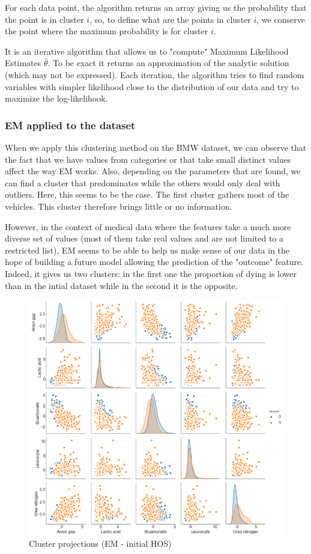 \documentclass[15pt]{article}
\begin{document}
\begin{multicols}{2}
For each data point, the algorithm returns an array giving us the probability that the point is in cluster $i$, so, to define what are the points in cluster $i$, we conserve the point where the maximum probability is for cluster $i$.

It is an iterative algorithm that allows us to "compute" Maximum Likelihood Estimates $\hat{\theta}$. To be exact it returns an approximation of the analytic solution (which may not be expressed). Each iteration, the algorithm tries to find random variables with simpler likelihood close to the distribution of our data and try to maximize the log-likelihook.

\subsubsection{EM applied to the dataset}

When we apply this clustering method on the BMW dataset, we can observe that the fact that we have values from categories or that take small distinct values affect the way EM works. Also, depending on the parameters that are found, we can find a cluster that predominates while the others would only deal with outliers. Here, this seems to be the case. The first cluster gathers most of the vehicles. This cluster therefore brings little or no information. 

However, in the context of medical data where the features take a much more diverse set of values (most of them take real values and are not limited to a restricted list), EM seems to be able to help us make sense of our data in the hope of building a future model allowing the prediction of the "outcome" feature. Indeed, it gives us two clusters: in the first one the proportion of dying is lower than in the intial dataset while in the second it is the opposite.

\begin{figure}[H]
\centering
\includegraphics[width = \columnwidth]{pplothosgaus.png}
\caption{Cluster projections (EM - initial HOS)}
\end{figure}


\end{multicols}
\end{document}

